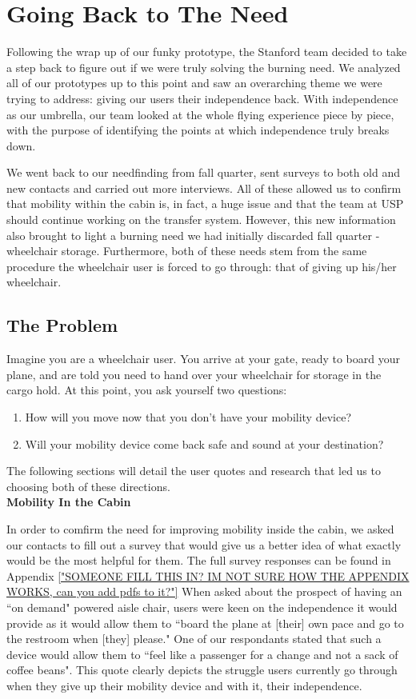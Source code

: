 \section{Going Back to The Need}
Following the wrap up of our funky prototype, the Stanford team decided to take a step back to figure out if we were truly solving the burning need. We analyzed all of our prototypes up to this point and saw an overarching theme we were trying to address: giving our users their independence back. With independence as our umbrella, our team looked at the whole flying experience piece by piece, with the purpose of identifying the points at which independence truly breaks down. 

We went back to our needfinding from fall quarter, sent surveys to both old and new contacts and carried out more interviews. All of these allowed us to confirm that mobility within the cabin is, in fact, a huge issue and that the team at USP should continue working on the transfer system. However, this new information also brought to light a burning need we had initially discarded fall quarter - wheelchair storage. Furthermore, both of these needs stem from the same procedure the wheelchair user is forced to go through: that of giving up his/her wheelchair. 

\subsection{The Problem}

Imagine you are a wheelchair user. You arrive at your gate, ready to board your plane, and are told you need to hand over your wheelchair for storage in the cargo hold. At this point, you ask yourself two questions: 
\begin{enumerate}
	\item How will you move now that you don't have your mobility device? 
	\item Will your mobility device come back safe and sound at your destination?
\end{enumerate}
The following sections will detail the user quotes and research that led us to choosing both of these directions.  
\\

\textbf{Mobility In the Cabin}

In order to comfirm the need for improving mobility inside the cabin, we asked our contacts to fill out a survey that would give us a better idea of what exactly would be the most helpful for them. The full survey responses can be found in Appendix \ref{"SOMEONE FILL THIS IN? IM NOT SURE HOW THE APPENDIX WORKS, can you add pdfs to it?"} 
When asked about the prospect of having an ``on demand"  powered aisle chair, users were keen on the independence it would provide as it would allow them to ``board the plane at [their] own pace and go to the restroom when [they] please." One of our respondants stated that such a device would allow them to ``feel like a passenger for a change and not a sack of coffee beans". This quote clearly depicts the struggle users currently go through when they give up their mobility device and with it, their independence.

